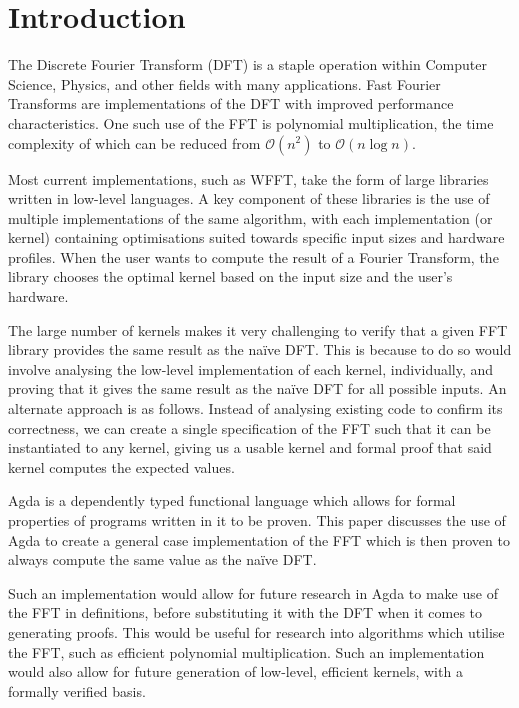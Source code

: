 \section{Introduction}

The Discrete Fourier Transform (DFT) is a staple operation within Computer 
Science, Physics, and other fields with many applications.
Fast Fourier Transforms are implementations of the DFT with improved 
performance characteristics.
One such use of the FFT is polynomial multiplication, the time 
complexity of which can be reduced from $\mathcal{O}\left(n^2\right)$ to
$\mathcal{O}\left(n\log n\right)$.

Most current implementations, such as WFFT\cite{Frigo2005}, take the form of 
large libraries written in low-level languages. 
A key component of these libraries is the use of multiple implementations of 
the same algorithm, with each implementation (or kernel) containing 
optimisations suited towards specific input sizes and hardware profiles. 
When the user wants to compute the result of a Fourier Transform, the library 
chooses the optimal kernel based on the input size and the user's hardware.

The large number of kernels makes it very challenging to verify that a given 
FFT library provides the same result as the naïve DFT.
This is because to do so would involve analysing the low-level implementation 
of each kernel, individually, and proving that it gives the same result as the 
naïve DFT for all possible inputs.
An alternate approach is as follows. %
Instead of analysing existing code to confirm its correctness, we can create a 
single specification of the FFT such that it can be instantiated to any kernel, 
giving us a usable kernel and formal proof that said kernel computes the 
expected values.

Agda is a dependently typed functional language which allows for formal 
properties of programs written in it to be proven.\cite{Norell2007} 
This paper discusses the use of Agda to create a general case implementation 
of the FFT which is then proven to always compute the same value as the naïve 
DFT.

Such an implementation would allow for future research in Agda to make use of
the FFT in definitions, before substituting it with the DFT when it comes to
generating proofs.
This would be useful for research into algorithms which utilise the FFT, such as
efficient polynomial multiplication.
Such an implementation would also allow for future generation of low-level, 
efficient kernels, with a formally verified basis.
